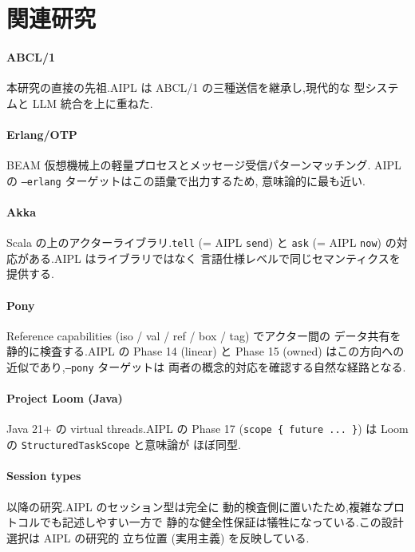 \documentclass[11pt,a4paper]{article}
\newcommand{\code}[1]{\texttt{\small #1}}
\begin{document}
\section{関連研究}
\label{sec:related}

\paragraph{ABCL/1 \cite{yonezawa1986abcl}}
本研究の直接の先祖.AIPL は ABCL/1 の三種送信を継承し,現代的な
型システムと LLM 統合を上に重ねた.

\paragraph{Erlang/OTP \cite{armstrong2007erlang}}
BEAM 仮想機械上の軽量プロセスとメッセージ受信パターンマッチング.
AIPL の \code{--erlang} ターゲットはこの語彙で出力するため,
意味論的に最も近い.

\paragraph{Akka \cite{akka2010}}
Scala の上のアクターライブラリ.\code{tell} (= AIPL \code{send}) と
\code{ask} (= AIPL \code{now}) の対応がある.AIPL はライブラリではなく
言語仕様レベルで同じセマンティクスを提供する.

\paragraph{Pony \cite{clebsch2015deny}}
Reference capabilities (iso / val / ref / box / tag) でアクター間の
データ共有を静的に検査する.AIPL の Phase 14 (linear) と Phase 15
(owned) はこの方向への近似であり,\code{--pony} ターゲットは
両者の概念的対応を確認する自然な経路となる.

\paragraph{Project Loom (Java) \cite{loom2023}}
Java 21+ の virtual threads.AIPL の Phase 17 (\code{scope \{
future ... \}}) は Loom の \code{StructuredTaskScope} と意味論が
ほぼ同型.

\paragraph{Session types}
\cite{honda1998session} 以降の研究.AIPL のセッション型は完全に
動的検査側に置いたため,複雑なプロトコルでも記述しやすい一方で
静的な健全性保証は犠牲になっている.この設計選択は AIPL の研究的
立ち位置 (実用主義) を反映している.
\end{document}
